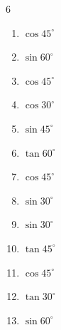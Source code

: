 \begin{multicols}{6}
\begin{enumerate}
  \item $\displaystyle \cos{45^\circ}$


  \item $\displaystyle \sin{60^\circ}$


  \item $\displaystyle \cos{45^\circ}$


  \item $\displaystyle \cos{30^\circ}$


  \item $\displaystyle \sin{45^\circ}$


  \item $\displaystyle \tan{60^\circ}$


  \item $\displaystyle \cos{45^\circ}$


  \item $\displaystyle \sin{30^\circ}$


  \item $\displaystyle \sin{30^\circ}$


  \item $\displaystyle \tan{45^\circ}$

        \phantom{$\displaystyle =1$}

  \item $\displaystyle \cos{45^\circ}$


  \item $\displaystyle \tan{30^\circ}$


\columnbreak %

  \item $\displaystyle \sin{60^\circ}$


\end{enumerate}
\end{multicols}

